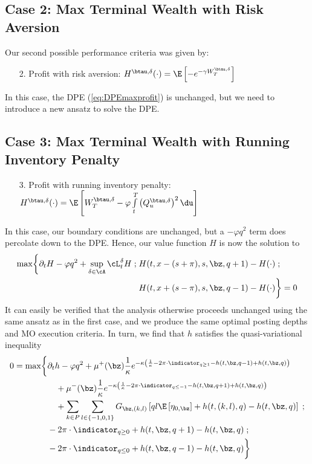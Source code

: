 \documentclass[12pt]{article}
\begin{document}
\subsection*{Case 2: Max Terminal Wealth with Risk Aversion}
Our second possible performance criteria was given by:
\begin{enumerate}[noitemsep, topsep=0pt]
\item[2.] Profit with risk aversion: $H^{\btau, \delta}(\cdot) = \E \left[ - e^{-\gamma W_T^{\btau, \delta}} \right] $
\end{enumerate}
In this case, the DPE (\ref{eq:DPEmaxprofit}) is unchanged, but we need to introduce a new ansatz to solve the DPE. 

\subsection*{Case 3: Max Terminal Wealth with Running Inventory Penalty}
\begin{enumerate}[noitemsep, topsep=0pt]
\item[3.] Profit with running inventory penalty: $H^{\btau, \delta}(\cdot) = \E \left[  W_T^{\btau, \delta}  - \varphi \int\limits_t^T \left( Q^{\btau, \delta}_u \right)^2 \du  \right]$
\end{enumerate}
In this case, our boundary conditions are unchanged, but a $-\varphi q^2$ term does percolate down to the DPE. Hence, our value function $H$ is now the solution to
\begin{equation}
\label{eq:DPEcase3}
\begin{split}
\max \biggl\lbrace \partial_t H - \varphi q^2 + \sup \limits_{\delta \in \cA} \cL^{\delta}_t H \; ; \; & H(t,x-(s+\pi), s, \bz, q+1) - H(\cdot) \; ; \\
&  H(t,x+(s-\pi), s, \bz, q-1) - H(\cdot) \biggr\rbrace = 0
\end{split}
\end{equation}
It can easily be verified that the analysis otherwise proceeds unchanged using the same ansatz as in the first case, and we produce the same optimal posting depths and MO execution criteria. In turn, we find that $h$ satisfies the quasi-variational inequality
\begin{equation}\label{eq:PDEcase1}
\begin{split}
0 = \max \biggl\lbrace & \partial_t h -\varphi q^2 + \mu^+(\bz) \frac{1}{\kappa} e^{ -\kappa \left( \frac{1}{\kappa} - 2 \pi \cdot \indicator_{q \geq 1} - h(t,\bz,q-1) + h(t,\bz,q)  \right)} \\
& \quad + \mu^-(\bz) \frac{1}{\kappa} e^{ -\kappa \left( \frac{1}{\kappa} - 2 \pi \cdot \indicator_{q \leq -1} - h(t,\bz,q+1) + h(t,\bz,q) \right)} \\
& \quad + \sum_{k\in P} \sum_{l \in \{-1,0,1\}} G_{\bz,(k,l)} \left[ ql \E \left[ \eta_{0,\bz} \right] + h(t,(k,l),q) - h(t,\bz,q) \right] \; ; \\
& -2 \pi \cdot \indicator_{q \geq 0} + h(t, \bz, q+1) - h(t,\bz,q)   \; ; \\
& -2 \pi \cdot \indicator_{q \leq 0} + h(t, \bz, q-1) - h(t,\bz,q)  \biggr\rbrace
\end{split}
\end{equation}
\end{document}
